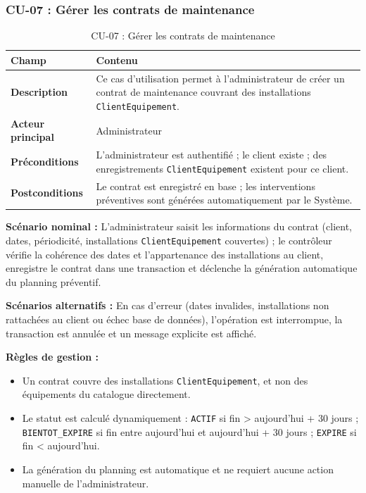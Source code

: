 \subsubsection{CU-07 : Gérer les contrats de maintenance}

\begin{table}[H]
\centering
\caption{CU-07 : Gérer les contrats de maintenance}
\label{tab:ch3:cu07}
\begin{tabular}{|p{3.5cm}|p{11cm}|}
\hline
\textbf{Champ} & \textbf{Contenu} \\
\hline
\textbf{Description}
  & Ce cas d'utilisation permet à l'administrateur de créer un contrat de maintenance
    couvrant des installations \texttt{ClientEquipement}. \\
\hline
\textbf{Acteur principal}
  & Administrateur \\
\hline
\textbf{Préconditions}
  & L'administrateur est authentifié ; le client existe ; des enregistrements
    \texttt{ClientEquipement} existent pour ce client. \\
\hline
\textbf{Postconditions}
  & Le contrat est enregistré en base ; les interventions préventives sont générées
    automatiquement par le Système. \\
\hline
\end{tabular}
\end{table}

\textbf{Scénario nominal :} L'administrateur saisit les informations du contrat (client, dates, périodicité, installations \texttt{ClientEquipement} couvertes) ; le contrôleur vérifie la cohérence des dates et l'appartenance des installations au client, enregistre le contrat dans une transaction et déclenche la génération automatique du planning préventif.

\textbf{Scénarios alternatifs :} En cas d'erreur (dates invalides, installations non rattachées au client ou échec base de données), l'opération est interrompue, la transaction est annulée et un message explicite est affiché.

\textbf{Règles de gestion :}
\begin{itemize}
    \item Un contrat couvre des installations \texttt{ClientEquipement}, et non des équipements
          du catalogue directement.
    \item Le statut est calculé dynamiquement : \texttt{ACTIF} si fin > aujourd'hui + 30 jours ;
          \texttt{BIENTOT\_EXPIRE} si fin entre aujourd'hui et aujourd'hui + 30 jours ;
          \texttt{EXPIRE} si fin < aujourd'hui.
    \item La génération du planning est automatique et ne requiert aucune action manuelle
          de l'administrateur.
\end{itemize}

